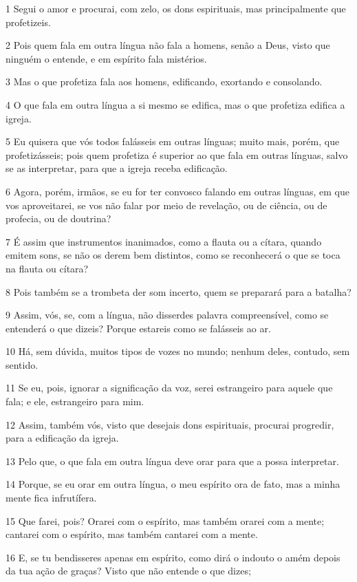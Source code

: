 \par 1 Segui o amor e procurai, com zelo, os dons espirituais, mas principalmente que profetizeis.
\par 2 Pois quem fala em outra língua não fala a homens, senão a Deus, visto que ninguém o entende, e em espírito fala mistérios.
\par 3 Mas o que profetiza fala aos homens, edificando, exortando e consolando.
\par 4 O que fala em outra língua a si mesmo se edifica, mas o que profetiza edifica a igreja.
\par 5 Eu quisera que vós todos falásseis em outras línguas; muito mais, porém, que profetizásseis; pois quem profetiza é superior ao que fala em outras línguas, salvo se as interpretar, para que a igreja receba edificação.
\par 6 Agora, porém, irmãos, se eu for ter convosco falando em outras línguas, em que vos aproveitarei, se vos não falar por meio de revelação, ou de ciência, ou de profecia, ou de doutrina?
\par 7 É assim que instrumentos inanimados, como a flauta ou a cítara, quando emitem sons, se não os derem bem distintos, como se reconhecerá o que se toca na flauta ou cítara?
\par 8 Pois também se a trombeta der som incerto, quem se preparará para a batalha?
\par 9 Assim, vós, se, com a língua, não disserdes palavra compreensível, como se entenderá o que dizeis? Porque estareis como se falásseis ao ar.
\par 10 Há, sem dúvida, muitos tipos de vozes no mundo; nenhum deles, contudo, sem sentido.
\par 11 Se eu, pois, ignorar a significação da voz, serei estrangeiro para aquele que fala; e ele, estrangeiro para mim.
\par 12 Assim, também vós, visto que desejais dons espirituais, procurai progredir, para a edificação da igreja.
\par 13 Pelo que, o que fala em outra língua deve orar para que a possa interpretar.
\par 14 Porque, se eu orar em outra língua, o meu espírito ora de fato, mas a minha mente fica infrutífera.
\par 15 Que farei, pois? Orarei com o espírito, mas também orarei com a mente; cantarei com o espírito, mas também cantarei com a mente.
\par 16 E, se tu bendisseres apenas em espírito, como dirá o indouto o amém depois da tua ação de graças? Visto que não entende o que dizes;
